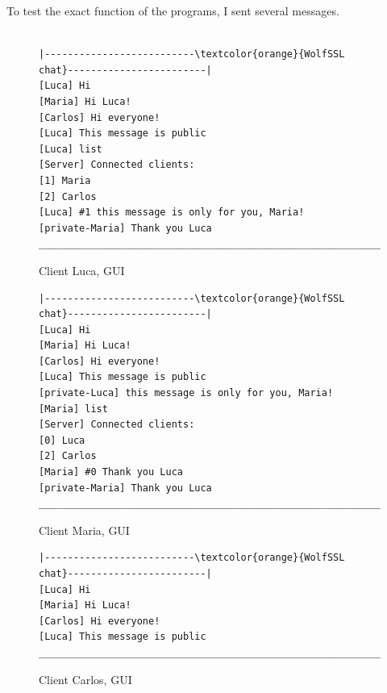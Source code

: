 \documentclass[a4paper,12pt]{article}
\begin{document}
To test the exact function of the programs, I sent several messages.
\begin{figure}[H]
\begin{Verbatim}[commandchars=\\\{\}]

|--------------------------\textcolor{orange}{WolfSSL chat}------------------------|
[Luca] Hi                          
[Maria] Hi Luca!
[Carlos] Hi everyone!
[Luca] This message is public
[Luca] list
[Server] Connected clients:
[1] Maria
[2] Carlos
[Luca] #1 this message is only for you, Maria!
[private-Maria] Thank you Luca
______________________________________________________________|
\end{Verbatim}
\caption{Client Luca, GUI}
\end{figure}

\begin{figure}[H]
\begin{Verbatim}[commandchars=\\\{\}]
|--------------------------\textcolor{orange}{WolfSSL chat}------------------------|
[Luca] Hi                          
[Maria] Hi Luca!
[Carlos] Hi everyone!
[Luca] This message is public
[private-Luca] this message is only for you, Maria!
[Maria] list
[Server] Connected clients:
[0] Luca
[2] Carlos
[Maria] #0 Thank you Luca
[private-Maria] Thank you Luca
______________________________________________________________|
\end{Verbatim}
\caption{Client Maria, GUI}
\end{figure}

\begin{figure}[H]
\begin{Verbatim}[commandchars=\\\{\}]
|--------------------------\textcolor{orange}{WolfSSL chat}------------------------|
[Luca] Hi                          
[Maria] Hi Luca!
[Carlos] Hi everyone!
[Luca] This message is public
______________________________________________________________|
\end{Verbatim}
\caption{Client Carlos, GUI}
\end{figure}
\end{document}
